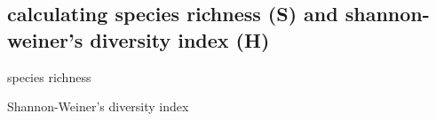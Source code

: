 \documentclass[
]{article}
\newenvironment{Shaded}{\begin{snugshade}}{\end{snugshade}}
\newcommand{\DataTypeTok}[1]{\textcolor[rgb]{0.13,0.29,0.53}{#1}}
\newcommand{\KeywordTok}[1]{\textcolor[rgb]{0.13,0.29,0.53}{\textbf{#1}}}
\newcommand{\NormalTok}[1]{#1}
\newcommand{\OperatorTok}[1]{\textcolor[rgb]{0.81,0.36,0.00}{\textbf{#1}}}
\newcommand{\StringTok}[1]{\textcolor[rgb]{0.31,0.60,0.02}{#1}}
\begin{document}
\hypertarget{calculating-species-richness-s-and-shannon-weiners-diversity-index-h}{%
\subsection{calculating species richness (S) and shannon-weiner's
diversity index
(H)}\label{calculating-species-richness-s-and-shannon-weiners-diversity-index-h}}

species richness

\begin{Shaded}
\end{Shaded}

Shannon-Weiner's diversity index
\end{document}
